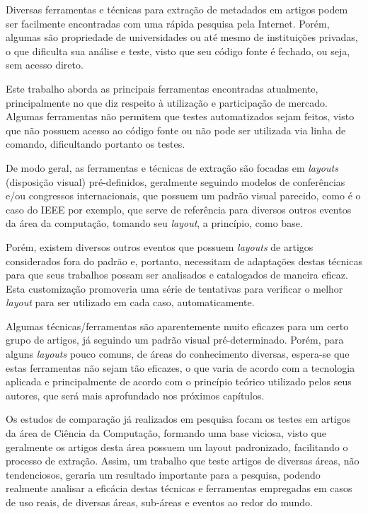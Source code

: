 Diversas ferramentas e técnicas para extração de metadados em artigos podem ser facilmente encontradas com uma rápida pesquisa pela Internet. Porém, algumas são propriedade de universidades ou até mesmo de instituições privadas, o que dificulta sua análise e teste, visto que seu código fonte é fechado, ou seja, sem acesso direto.

\begin{textedited}
Este trabalho aborda as principais ferramentas encontradas atualmente, principalmente no que diz respeito à utilização e participação de mercado. Algumas ferramentas não permitem que testes automatizados sejam feitos, visto que não possuem acesso ao código fonte ou não pode ser utilizada via linha de comando, dificultando portanto os testes.
\end{textedited}

De modo geral, as ferramentas e técnicas de extração são focadas em \textit{layouts} (disposição visual) pré-definidos, geralmente seguindo modelos de conferências e/ou congressos internacionais, que possuem um padrão visual parecido, como é o caso do IEEE por exemplo, que serve de referência para diversos outros eventos da área da computação, tomando seu \textit{layout}, a princípio, como base.

Porém, existem diversos outros eventos que possuem \textit{layouts} de artigos considerados fora do padrão e, portanto, necessitam de adaptações destas técnicas para que seus trabalhos possam ser analisados e catalogados de maneira eficaz. Esta customização promoveria uma série de tentativas para verificar o melhor \textit{layout} para ser utilizado em cada caso, automaticamente.

Algumas técnicas/ferramentas são aparentemente muito eficazes para um certo grupo de artigos, já seguindo um padrão visual pré-determinado. Porém, para alguns \textit{layouts} pouco comuns, de áreas do conhecimento diversas, espera-se que estas ferramentas não sejam tão eficazes, o que varia de acordo com a tecnologia aplicada e principalmente de acordo com o princípio teórico utilizado pelos seus autores, que será mais aprofundado nos próximos capítulos.

Os estudos de comparação já realizados em pesquisa focam os testes em artigos da área de Ciência da Computação, formando uma base viciosa, visto que geralmente os artigos desta área possuem um layout padronizado, facilitando o processo de extração. Assim, um trabalho que teste artigos de diversas áreas, não tendenciosos, geraria um resultado importante para a pesquisa, podendo realmente analisar a eficácia destas técnicas e ferramentas empregadas em casos de uso reais, de diversas áreas, sub-áreas e eventos ao redor do mundo.

